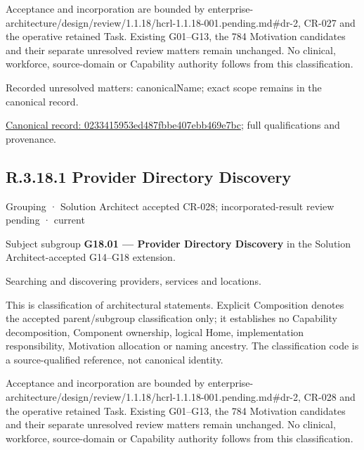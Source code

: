 Acceptance and incorporation are bounded by enterprise-architecture/design/review/1.1.18/hcrl-1.1.18-001.pending.md\#dr-2, CR-027 and the operative retained Task. Existing G01–G13, the 784 Motivation candidates and their separate unresolved review matters remain unchanged. No clinical, workforce, source-domain or Capability authority follows from this classification.


{\small Recorded unresolved matters: canonicalName; exact scope remains in the canonical record.}\par
{\footnotesize \href{../../../../continuum/grouping/0233415953ed487fbbe407ebb469e7bc.md}{Canonical record: 0233415953ed487fbbe407ebb469e7bc}; full qualifications and provenance.}\par
\subsection*{R.3.18.1 Provider Directory Discovery}
\label{navigation:R.3.18.1}

\label{element:c445fc55a6e547ae9b1a5bb43cad1a8e}
{\small Grouping · Solution Architect accepted CR-028; incorporated-result review pending · current}\par

Subject subgroup \textbf{G18.01 — Provider Directory Discovery} in the Solution Architect-accepted G14–G18 extension.



Searching and discovering providers, services and locations.



This is classification of architectural statements. Explicit Composition denotes the accepted parent/subgroup classification only; it establishes no Capability decomposition, Component ownership, logical Home, implementation responsibility, Motivation allocation or naming ancestry. The classification code is a source-qualified reference, not canonical identity.



Acceptance and incorporation are bounded by enterprise-architecture/design/review/1.1.18/hcrl-1.1.18-001.pending.md\#dr-2, CR-028 and the operative retained Task. Existing G01–G13, the 784 Motivation candidates and their separate unresolved review matters remain unchanged. No clinical, workforce, source-domain or Capability authority follows from this classification.


